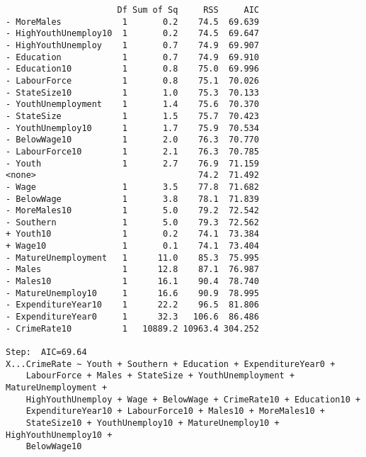 \documentclass[11pt]{article}
\begin{document}
\begin{enumerate}
\begin{verbatim}
                      Df Sum of Sq     RSS     AIC
- MoreMales            1       0.2    74.5  69.639
- HighYouthUnemploy10  1       0.2    74.5  69.647
- HighYouthUnemploy    1       0.7    74.9  69.907
- Education            1       0.7    74.9  69.910
- Education10          1       0.8    75.0  69.996
- LabourForce          1       0.8    75.1  70.026
- StateSize10          1       1.0    75.3  70.133
- YouthUnemployment    1       1.4    75.6  70.370
- StateSize            1       1.5    75.7  70.423
- YouthUnemploy10      1       1.7    75.9  70.534
- BelowWage10          1       2.0    76.3  70.770
- LabourForce10        1       2.1    76.3  70.785
- Youth                1       2.7    76.9  71.159
<none>                                74.2  71.492
- Wage                 1       3.5    77.8  71.682
- BelowWage            1       3.8    78.1  71.839
- MoreMales10          1       5.0    79.2  72.542
- Southern             1       5.0    79.3  72.562
+ Youth10              1       0.2    74.1  73.384
+ Wage10               1       0.1    74.1  73.404
- MatureUnemployment   1      11.0    85.3  75.995
- Males                1      12.8    87.1  76.987
- Males10              1      16.1    90.4  78.740
- MatureUnemploy10     1      16.6    90.9  78.995
- ExpenditureYear10    1      22.2    96.5  81.806
- ExpenditureYear0     1      32.3   106.6  86.486
- CrimeRate10          1   10889.2 10963.4 304.252

Step:  AIC=69.64
X...CrimeRate ~ Youth + Southern + Education + ExpenditureYear0 + 
    LabourForce + Males + StateSize + YouthUnemployment + MatureUnemployment + 
    HighYouthUnemploy + Wage + BelowWage + CrimeRate10 + Education10 + 
    ExpenditureYear10 + LabourForce10 + Males10 + MoreMales10 + 
    StateSize10 + YouthUnemploy10 + MatureUnemploy10 + HighYouthUnemploy10 + 
    BelowWage10


\end{verbatim}
\end{enumerate}
\end{document}
